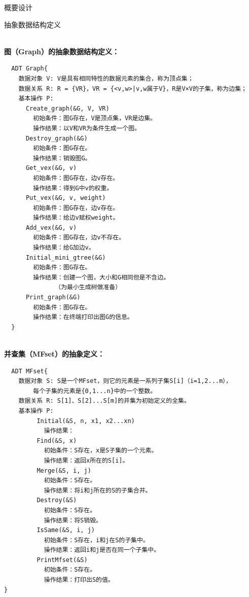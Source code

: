 \documentclass[UTF8]{ctexart}
\begin{document}
\begin{section}{概要设计}

\begin{subsection}{抽象数据结构定义}

\textbf{\\图（Graph）的抽象数据结构定义：}

\begin{mdframed}[everyline=true]
\begin{lstlisting}
  ADT Graph{
    数据对象 V: V是具有相同特性的数据元素的集合，称为顶点集；
    数据关系 R: R = {VR}，VR = {<v,w>|v,w属于V}，R是V×V的子集，称为边集；
    基本操作 P: 
      Create_graph(&G, V, VR)
        初始条件：图G存在，V是顶点集，VR是边集。
        操作结果：以V和VR为条件生成一个图。
      Destroy_graph(&G)
        初始条件：图G存在。
        操作结果：销毁图G。
      Get_vex(&G, v)
        初始条件：图G存在，边v存在。
        操作结果：得到G中v的权重。
      Put_vex(&G, v, weight)
        初始条件：图G存在，边v存在。
        操作结果：给边v赋权weight。
      Add_vex(&G, v)
        初始条件：图G存在，边v不存在。
        操作结果：给G加边v。
      Initial_mini_gtree(&G)
        初始条件：图G存在。
        操作结果：创建一个图，大小和G相同但是不含边。
              （为最小生成树做准备）
      Print_graph(&G)
        初始条件：图G存在。
        操作结果：在终端打印出图G的信息。
  }
\end{lstlisting} 
\end{mdframed}

\textbf{\\并查集（MFset）的抽象定义：}

\begin{mdframed}[everyline=true]
\begin{lstlisting}
  ADT MFset{
    数据对象 S: S是一个MFset，则它的元素是一系列子集S[i]（i=1,2...m），
        每个子集的元素是{0,1...n}中的一个整数。
    数据关系 R: S[1]、S[2]...S[m]的并集为初始定义的全集。
    基本操作 P:
    	 Initial(&S, n, x1, x2...xn)
    	   操作结果：
    	 Find(&S, x)
    	   初始条件：S存在，x是S子集的一个元素。
    	   操作结果：返回x所在的S[i]。
    	 Merge(&S, i, j)
    	   初始条件：S存在。
    	   操作结果：将i和j所在的S的子集合并。
    	 Destroy(&S)
    	   初始条件：S存在。
    	   操作结果：将S销毁。
    	 IsSame(&S, i, j)
    	   初始条件：S存在，i和j在S的子集中。
    	   操作结果：返回i和j是否在同一个子集中。
    	 PrintMfset(&S)
    	   初始条件：S存在。
    	   操作结果：打印出S的值。
}
\end{lstlisting}
\end{mdframed}


\end{subsection}
\end{section}
\end{document}
